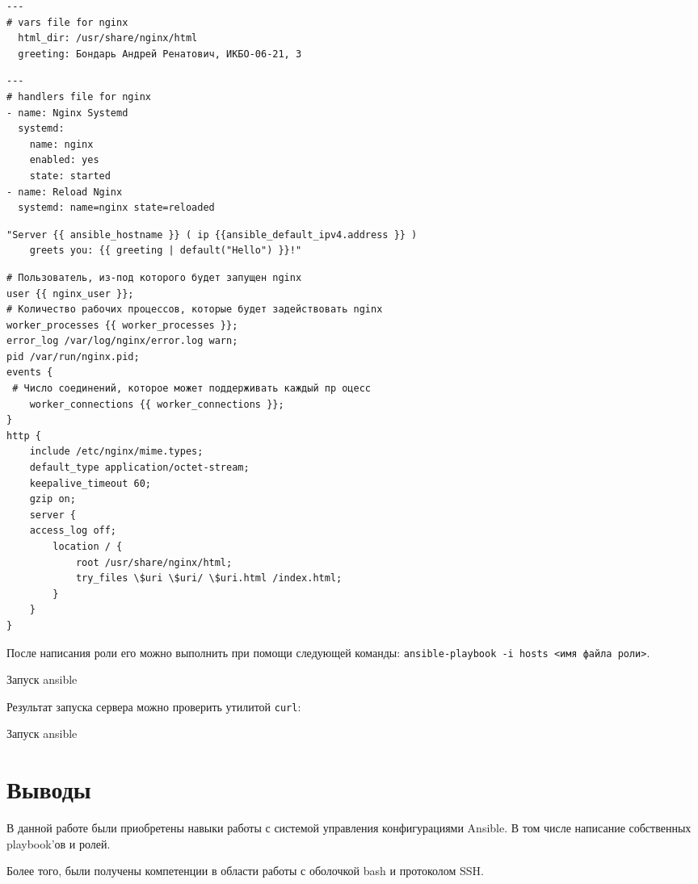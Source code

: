 \begin{lstlisting}[language=xml
	, caption=\leftline{Переменные, используемые в роли}
	]
---
# vars file for nginx
  html_dir: /usr/share/nginx/html
  greeting: Бондарь Андрей Ренатович, ИКБО-06-21, 3
\end{lstlisting}

\begin{lstlisting}[language=xml
	, caption=\leftline{Обработчики (handlers), используемые в роли}
	]
---
# handlers file for nginx
- name: Nginx Systemd
  systemd:
    name: nginx
    enabled: yes
    state: started
- name: Reload Nginx
  systemd: name=nginx state=reloaded
\end{lstlisting}

\begin{lstlisting}[language=xml
	, caption=\leftline{Шаблон страницы, используемый в роли}
	]
"Server {{ ansible_hostname }} ( ip {{ansible_default_ipv4.address }} )
	greets you: {{ greeting | default("Hello") }}!"
\end{lstlisting}


\begin{lstlisting}[language=xml
	, caption=\leftline{Шаблон конфигурационного файла, используемый в роли}
	]
# Пользователь, из-под которого будет запущен nginx
user {{ nginx_user }};
# Количество рабочих процессов, которые будет задействовать nginx
worker_processes {{ worker_processes }};
error_log /var/log/nginx/error.log warn;
pid /var/run/nginx.pid;
events {
 # Число соединений, которое может поддерживать каждый пр оцесс
	worker_connections {{ worker_connections }};
}
http {
	include /etc/nginx/mime.types;
	default_type application/octet-stream;
	keepalive_timeout 60;
	gzip on;
	server {
	access_log off;
		location / {
			root /usr/share/nginx/html;
			try_files \$uri \$uri/ \$uri.html /index.html;
		}
	}
}
\end{lstlisting}

После написания роли его можно выполнить при помощи
следующей команды: \texttt{ansible-playbook -i hosts <имя файла роли>}.

\begin{image}
	\caption{Запуск ansible}
\end{image}

Результат запуска сервера можно проверить утилитой \texttt{curl}:

\begin{image}
	\caption{Запуск ansible}
\end{image}

\clearpage

\section*{\LARGE Выводы}
В данной работе были приобретены навыки работы с системой 
управления конфигурациями Ansible. В том числе написание собственных
playbook'ов и ролей.\par
Более того, были получены 
компетенции в области работы с оболочкой bash и протоколом SSH.

